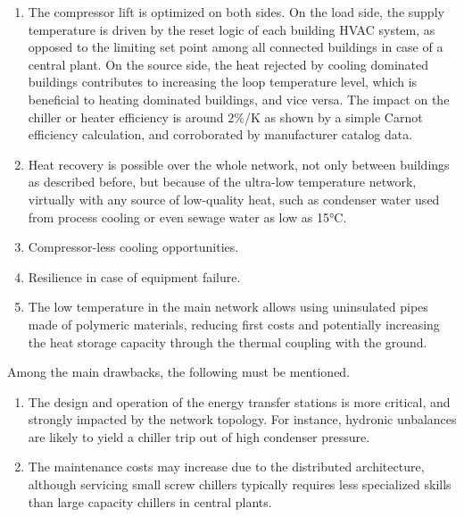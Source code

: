 \begin{enumerate}

    \item The compressor lift is optimized on both sides. On the load side, the supply temperature is driven by the reset logic of each building HVAC system, as opposed to the limiting set point among all connected buildings in case of a central plant. On the source side, the heat rejected by cooling dominated buildings contributes to increasing the loop temperature level, which is beneficial to heating dominated buildings, and vice versa. The impact on the chiller or heater efficiency is around $2$\%/K as shown by a simple Carnot efficiency calculation, and corroborated by manufacturer catalog data.

    \item Heat recovery is possible over the whole network, not only between buildings as described before, but because of the ultra-low temperature network, virtually with any source of low-quality heat, such as condenser water used from process cooling or even sewage water as low as 15°C.

    \item Compressor-less cooling opportunities.

    \item Resilience in case of equipment failure.

    \item The low temperature in the main network allows using uninsulated pipes made of polymeric materials, reducing first costs and potentially increasing the heat storage capacity through the thermal coupling with the ground.

\end{enumerate}

Among the main drawbacks, the following must be mentioned.
\begin{enumerate}
    \item The design and operation of the energy transfer stations is more critical, and strongly impacted by the network topology. For instance, hydronic unbalances are likely to yield a  chiller trip out of high condenser pressure.

    \item The maintenance costs may increase due to the distributed architecture, although servicing small screw chillers typically requires less specialized skills than large capacity chillers in central plants.
\end{enumerate}


